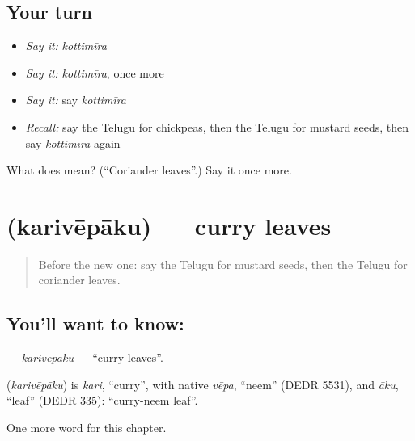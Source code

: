 \subsection*{Your turn}
\begin{itemize}
\raggedright
  \item \emph{Say it:} \emph{kottimīra}
  \item \emph{Say it:} \emph{kottimīra}, once more
  \item \emph{Say it:} say \emph{kottimīra}
  \item \emph{Recall:} say the Telugu for chickpeas, then the Telugu for mustard seeds, then say \emph{kottimīra} again
\end{itemize}

\begin{tcolorbox}[breakable,colback=teal!4,colframe=teal!35!black,title={Before you move on}]
What does  mean? (\textquotedblleft{}Coriander leaves\textquotedblright{}.) Say it once more.
\end{tcolorbox}
\section[\texorpdfstring{\te{కరివేపాకు} (karivēpāku)}{కరివేపాకు (karivēpāku)}]{ (karivēpāku) — curry leaves}

\label{lesson:TE-C299-karivepaku}



\begin{quote}
Before the new one: say the Telugu for mustard seeds, then the Telugu for coriander leaves.
\end{quote}

\subsection*{You'll want to know: }
\textbf{} — \emph{karivēpāku} — \textquotedblleft{}curry leaves\textquotedblright{}.

\begin{cousinweb}
\textbf{} (\emph{karivēpāku}) is \emph{kari}, \textquotedblleft{}curry\textquotedblright{}, with native \emph{vēpa}, \textquotedblleft{}neem\textquotedblright{} (DEDR 5531), and \emph{āku}, \textquotedblleft{}leaf\textquotedblright{} (DEDR 335): \textquotedblleft{}curry-neem leaf\textquotedblright{}.
\end{cousinweb}

\begin{grammarlens}[title={What you've built}]
One more word for this chapter.
\end{grammarlens}

